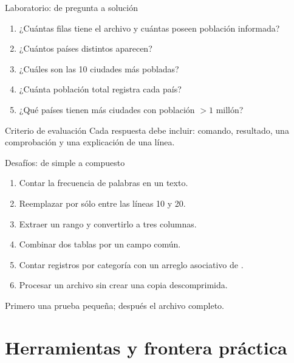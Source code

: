 \documentclass[aspectratio=169,11pt]{beamer}
\begin{document}
\begin{frame}[fragile]{Laboratorio: de pregunta a solución}
  \begin{enumerate}
    \item ¿Cuántas filas tiene el archivo y cuántas poseen población informada?
    \item ¿Cuántos países distintos aparecen?
    \item ¿Cuáles son las 10 ciudades más pobladas?
    \item ¿Cuánta población total registra cada país?
    \item ¿Qué países tienen más ciudades con población $>1$ millón?
  \end{enumerate}
  \vspace{4mm}
  \begin{wideblock}{Criterio de evaluación}
    Cada respuesta debe incluir: comando, resultado, una comprobación y una explicación de una línea.
  \end{wideblock}
\end{frame}

\begin{frame}[fragile]{Desafíos: de simple a compuesto}
  \begin{enumerate}
    \item Contar la frecuencia de palabras en un texto.
    \item Reemplazar  por  sólo entre las líneas 10 y 20.
    \item Extraer un rango  y convertirlo a tres columnas.
    \item Combinar dos tablas por un campo común.
    \item Contar registros por categoría con un arreglo asociativo de .
    \item Procesar un archivo  sin crear una copia descomprimida.
  \end{enumerate}
  \vspace{3mm}
  \quad Primero una prueba pequeña; después el archivo completo.
\end{frame}

\section{Herramientas y frontera práctica}
\end{document}
